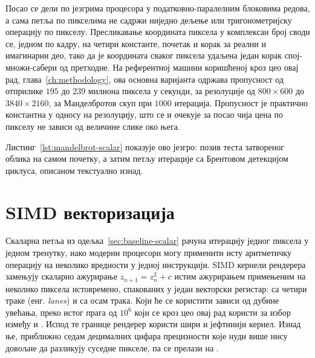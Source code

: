 \documentclass[serbian]{ftndiplomski}
\begin{document}
Посао се дели по језгрима процесора у податковно-паралелним блоковима редова, а сама
петља по пикселима не садржи ниједно дељење или тригонометријску операцију по пикселу.
Пресликавање координата пиксела у комплексан број своди се, једном по кадру, на четири
константе, почетак и корак за реални и имагинарни део, тако да је координата сваког
пиксела удаљена један корак спој-множи-сабери од претходне. На референтној машини
коришћеној кроз цео овај рад, глава~\ref{ch:methodology}, ова основна варијанта
одржава пропусност од отприлике $195$ до $239$ милиона пиксела у секунди, за
резолуције од $800\times600$ до $3840\times2160$, за Манделбротов скуп при $1000$
итерација. Пропусност је практично константна у односу на резолуцију, што се и очекује
за посао чија цена по пикселу не зависи од величине слике око њега.

Листинг~\ref{lst:mandelbrot-scalar} показује ово језгро: позив теста затвореног
облика на самом почетку, а затим петљу итерације са Брентовом детекцијом циклуса,
описаном текстуално изнад.

\noindent\begin{minipage}{\linewidth}

\end{minipage}

\section{SIMD векторизација}
\label{sec:simd}

Скаларна петља из одељка~\ref{sec:baseline-scalar} рачуна итерацију једног пиксела у
једном тренутку, иако модерни процесори могу применити исту аритметичку операцију на
неколико вредности у једној инструкцији. SIMD кернели рендерера замењују скаларно
ажурирање $z_{n+1}=z_n^2+c$ истим ажурирањем примењеним на неколико пиксела
истовремено, спакованих у један векторски регистар:  са четири 
траке (енг. \emph{lanes}) и  са осам  трака. Који ће се користити
зависи од дубине увећања, преко истог прага од $10^6$ који се кроз цео овај рад
користи за избор између  и . Испод те границе рендерер користи шири
и јефтинији  кернел. Изнад ње, приближно седам децималних цифара
прецизности које нуди  више нису довољне да разликују суседне пикселе, па се
прелази на .
\end{document}

